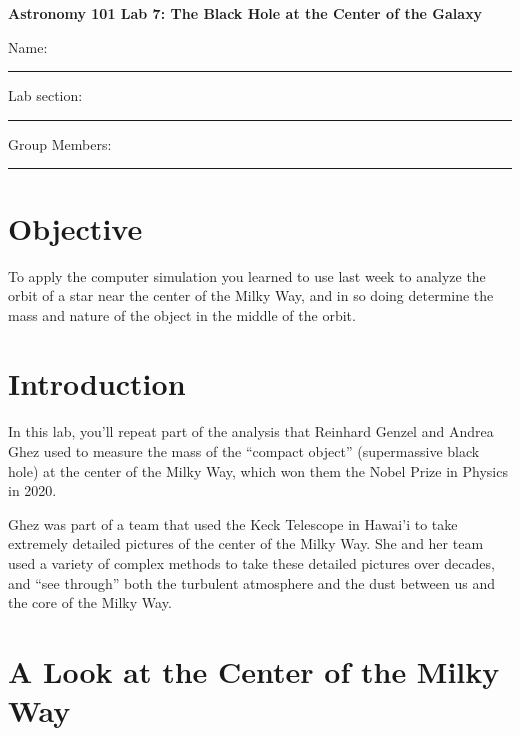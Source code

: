\documentclass[11pt]{article}
\begin{document}
\begin{center}
\textbf{\Large
\vspace*{0.1cm}
Astronomy 101 Lab 7: The Black Hole at the Center of the Galaxy
}
\end{center}

\vspace*{0.5cm}

{\Large Name:}\vspace*{0.5cm}\\\hrule
{\Large Lab section:}\vspace*{0.5cm}\\\hrule
{\Large Group Members:}\vspace*{0.5cm}\\\hrule
\vspace*{0.5cm}


\section{Objective}

To apply the computer simulation you learned to use last week to analyze the orbit of a star near the center of the Milky Way, and in so doing determine the mass and nature of the object in the middle of the orbit.



\section{Introduction}
In this lab, you’ll repeat part of the analysis that Reinhard Genzel and Andrea Ghez used to measure the mass of the “compact object” (supermassive black hole) at the center of the Milky Way, which won them the Nobel Prize in Physics in 2020.

Ghez was part of a team that used the Keck Telescope in Hawai’i to take extremely detailed pictures of the center of the Milky Way. She and her team used a variety of complex methods to take these detailed pictures over decades, and “see through” both the turbulent atmosphere and the dust between us and the core of the Milky Way.



\section{A Look at the Center of the Milky Way}
\end{document}
